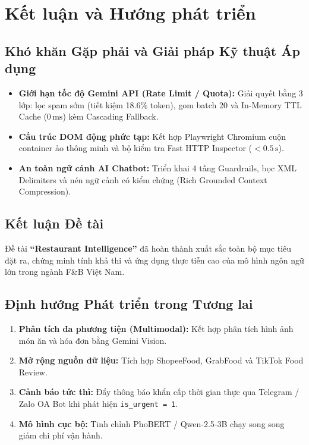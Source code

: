 \chapter{Kết luận và Hướng phát triển}

\section{Khó khăn Gặp phải và Giải pháp Kỹ thuật Áp dụng}
\begin{itemize}
    \item \textbf{Giới hạn tốc độ Gemini API (Rate Limit / Quota):} Giải quyết bằng 3 lớp: lọc spam sớm (tiết kiệm 18.6\% token), gom batch 20 và In-Memory TTL Cache ($0\,\mathrm{ms}$) kèm Cascading Fallback.
    \item \textbf{Cấu trúc DOM động phức tạp:} Kết hợp Playwright Chromium cuộn container ảo thông minh và bộ kiểm tra Fast HTTP Inspector ($<0.5\,\mathrm{s}$).
    \item \textbf{An toàn ngữ cảnh AI Chatbot:} Triển khai 4 tầng Guardrails, bọc XML Delimiters và nén ngữ cảnh có kiểm chứng (Rich Grounded Context Compression).
\end{itemize}

\section{Kết luận Đề tài}
Đề tài \textbf{``Restaurant Intelligence''} đã hoàn thành xuất sắc toàn bộ mục tiêu đặt ra, chứng minh tính khả thi và ứng dụng thực tiễn cao của mô hình ngôn ngữ lớn trong ngành F\&B Việt Nam.

\section{Định hướng Phát triển trong Tương lai}
\begin{enumerate}
    \item \textbf{Phân tích đa phương tiện (Multimodal):} Kết hợp phân tích hình ảnh món ăn và hóa đơn bằng Gemini Vision.
    \item \textbf{Mở rộng nguồn dữ liệu:} Tích hợp ShopeeFood, GrabFood và TikTok Food Review.
    \item \textbf{Cảnh báo tức thì:} Đẩy thông báo khẩn cấp thời gian thực qua Telegram / Zalo OA Bot khi phát hiện \texttt{is\_urgent = 1}.
    \item \textbf{Mô hình cục bộ:} Tinh chỉnh PhoBERT / Qwen-2.5-3B chạy song song giảm chi phí vận hành.
\end{enumerate}
